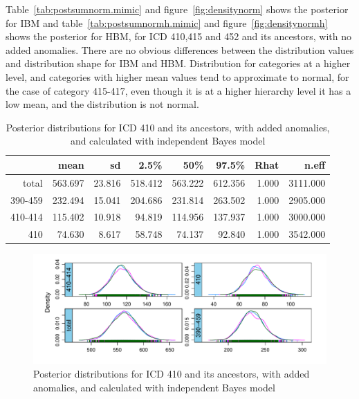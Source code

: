 Table~\ref{tab:postsumnorm.mimic} and figure~\ref{fig:densitynorm} shows the posterior for IBM and table~\ref{tab:postsumnormh.mimic} and figure~\ref{fig:densitynormh} shows the posterior for HBM, for ICD 410,415 and 452 and its ancestors, with no added anomalies. There are no obvious differences between the distribution values and distribution shape for IBM and HBM. Distribution for categories at a higher level, and categories with higher mean values tend to approximate to normal, for the case of category 415-417, even though it is at a higher hierarchy level it has a low mean, and the distribution is not normal. 

\newpage%

\begin{table}[!t]
	\centering
	\begin{tabular}{rrrrrrrr}
		\hline
		& mean & sd & 2.5\% & 50\% & 97.5\% & Rhat & n.eff \\ 
		\hline
		total & 563.697 & 23.816 & 518.412 & 563.222 & 612.356 & 1.000 & 3111.000 \\ 
		390-459 & 232.494 & 15.041 & 204.686 & 231.814 & 263.502 & 1.000 & 2905.000 \\ 
		410-414 & 115.402 & 10.918 & 94.819 & 114.956 & 137.937 & 1.000 & 3000.000 \\ 
		410 & 74.630 & 8.617 & 58.748 & 74.137 & 92.840 & 1.000 & 3542.000 \\ 
		\hline
	\end{tabular}
	\caption{Posterior distributions for ICD 410 and its ancestors, with added anomalies, and calculated with independent Bayes model} 
	\label{tab:postsum410.mimic}
\end{table}

\begin{figure}[!h]
	\centering
	\includegraphics[width=1\linewidth]{../../R-codes/JAGS/plots/mimic/Density410}
	\caption{Posterior distributions for ICD 410 and its ancestors, with added anomalies, and calculated with independent Bayes model}
	\label{fig:density410}
\end{figure}

